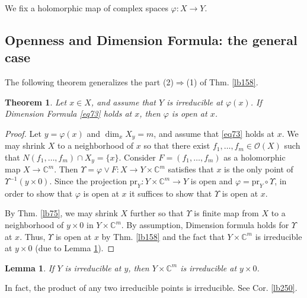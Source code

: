 \documentclass[12pt,b5paper,notitlepage]{report}
\theoremstyle{definition}
\theoremstyle{plain}
\newtheorem{thm}[df]{Theorem}
\newtheorem{lm}[df]{Lemma}
\newcommand{\scr}{\mathscr}
\newcommand{\Cbb}{\mathbb C}
\newcommand{\pr}{\mathrm {pr}}
\numberwithin{equation}{section}
\begin{document}
We fix a holomorphic map of complex spaces $\varphi:X\rightarrow Y$. 

\subsection{Openness and Dimension Formula: the general case}

The following theorem generalizes the part (2)$\Rightarrow$(1) of Thm. \ref{lb158}.


\begin{thm}\label{lb163}
Let $x\in X$, and assume that $Y$ is irreducible at $\varphi(x)$. If Dimension Formula \eqref{eq73} holds at $x$, then $\varphi$ is open at $x$.
\end{thm}

\begin{proof}
Let $y=\varphi(x)$ and $\dim_xX_y=m$, and assume that \eqref{eq73} holds at $x$. We may shrink $X$ to a neighborhood of $x$ so that there exist $f_1,\dots,f_m\in\scr O(X)$ such that $N(f_1,\dots,f_m)\cap X_y=\{x\}$. Consider $F=(f_1,\dots,f_m)$ as a holomorphic map $X\rightarrow\Cbb^m$. Then $\Upsilon=\varphi\vee F:X\rightarrow Y\times \Cbb^m$ satisfies that $x$ is the only point of $\Upsilon^{-1}(y\times 0)$. Since the projection $\pr_Y:Y\times\Cbb^m\rightarrow Y$ is open and $\varphi=\pr_Y\circ\Upsilon$, in order to show that $\varphi$ is open at $x$ it suffices to show that $\Upsilon$ is open at $x$. 

By Thm. \ref{lb75}, we may shrink $X$ further so that $\Upsilon$ is finite map from $X$ to a neighborhood of $y\times 0$ in $Y\times\Cbb^m$. By assumption, Dimension formula holds for $\Upsilon$ at $x$. Thus, $\Upsilon$ is open at $x$ by Thm. \ref{lb158} and the fact that $Y\times\Cbb^m$ is irreducible at $y\times 0$ (due to Lemma \ref{lb161}).
\end{proof}

\begin{lm}\label{lb161}
If $Y$ is irreducible at $y$, then $Y\times\Cbb^m$ is irreducible at $y\times 0$.
\end{lm}


In fact, the product of any two irreducible points is irreducible. See Cor. \ref{lb250}.
\end{document}
